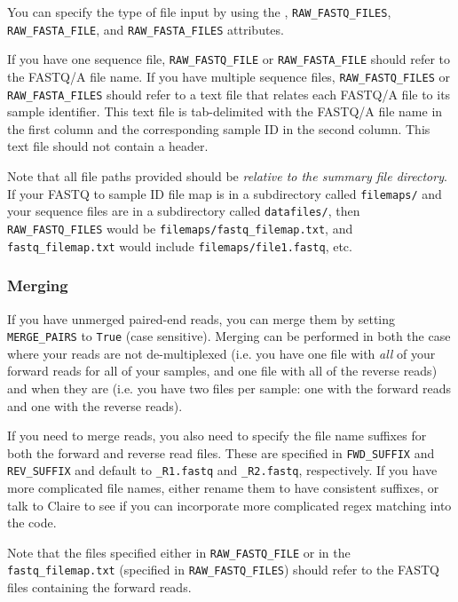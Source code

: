 \documentclass[11pt, oneside]{article}   	%
\begin{document}
You can specify the type of file input by using the , 
\texttt{RAW\_FASTQ\_FILES}, \texttt{RAW\_FASTA\_FILE}, and \texttt{RAW\_FASTA\_FILES} attributes.

If you have one sequence file, \texttt{RAW\_FASTQ\_FILE} or \texttt{RAW\_FASTA\_FILE}
should refer to the FASTQ/A file name. If you have multiple sequence files, 
\texttt{RAW\_FASTQ\_FILES} or \texttt{RAW\_FASTA\_FILES} should refer to 
a text file that relates each FASTQ/A file to its sample identifier.
This text file is tab-delimited with the FASTQ/A file name in the first column
and the corresponding sample ID in the second column. This text file should
not contain a header.

Note that all file paths provided should be 
\textit{relative to the summary file directory}. If your FASTQ to sample ID
file map is in a subdirectory called \texttt{filemaps/} and your
sequence files are in a subdirectory called \texttt{datafiles/}, then 
\texttt{RAW\_FASTQ\_FILES} would be \texttt{filemaps/fastq\_filemap.txt},
and \texttt{fastq\_filemap.txt} would include \texttt{filemaps/file1.fastq}, etc.

\subsubsection{Merging}

If you have unmerged paired-end reads, you can merge them by setting 
\texttt{MERGE\_PAIRS} to \texttt{True} (case sensitive). Merging can be
performed in both the case where your reads are not de-multiplexed (i.e.
you have one file with \textit{all} of your forward reads for all of your
samples, and one file with all of the reverse reads) and when they are
(i.e. you have two files per sample: one with the forward reads and one with
the reverse reads). 

If you need to merge reads, you also need to specify the file name suffixes
for both the forward and reverse read files. These are specified in
\texttt{FWD\_SUFFIX} and \texttt{REV\_SUFFIX} and default to \texttt{\_R1.fastq}
and \texttt{\_R2.fastq}, respectively. If you have more complicated file names,
either rename them to have consistent suffixes, or talk to Claire to see if you
can incorporate more complicated regex matching into the code.

Note that the files specified either in \texttt{RAW\_FASTQ\_FILE} or in the
\texttt{fastq\_filemap.txt} (specified in \texttt{RAW\_FASTQ\_FILES}) should refer
to the FASTQ files containing the forward reads.
\end{document}
